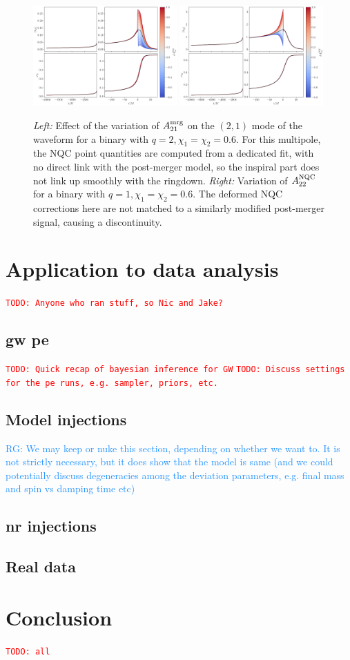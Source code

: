 \documentclass[prd,amssymb,amsmath,amsfonts,nofootinbib,reprint,showpacs,longbibliography]{revtex4-1}
\newcommand{\RG}[1]{{\textcolor{dodgerblue}{{RG: #1}} }}
\newcommand{\todo}[1]{\textcolor{red}{\texttt{TODO: #1}}}
\newcommand{\amrg}[1]{{A_{#1}^{\rm mrg}}}
\newcommand{\anqc}[1]{{A_{#1}^{\rm NQC}}}
\begin{document}
\begin{figure}
    \includegraphics[width=0.49\textwidth]{figs/delta_A21_mrg_-0.8_1.0.png}
    \includegraphics[width=0.49\textwidth]{figs/delta_A22_nqc_-0.8_1.0.png}
    \caption{\textit{Left:} Effect of the variation of $\amrg{21}$ on the $(2,1)$ mode of the waveform
    for a binary with $q = 2, \chi_1 = \chi_2 = 0.6$.
    For this multipole, the NQC point quantities are computed from a dedicated fit, with no direct link
    with the post-merger model, so the inspiral part does not link up smoothly with the ringdown.
    \textit{Right:} Variation of $\anqc{22}$ for a binary with $q = 1, \chi_1 = \chi_2 = 0.6$. The
    deformed NQC corrections here are not matched to a similarly modified post-merger signal, causing a discontinuity.}
\end{figure}

\section{Application to data analysis}
\todo{Anyone who ran stuff, so Nic and Jake? }

\subsection{\ac{gw} \ac{pe}}
\todo{Quick recap of bayesian inference for GW}
\todo{Discuss settings for the \ac{pe} runs, e.g. sampler, priors, etc.}

\subsection{Model injections}
\RG{We may keep or nuke this section, depending on whether we want to. It is not strictly necessary,
but it does show that the model is same (and we could potentially discuss degeneracies among the deviation parameters,
e.g. final mass and spin vs damping time etc)}

\subsection{\ac{nr} injections}

\subsection{Real data}

\section{Conclusion}
\todo{all}


\end{document}
